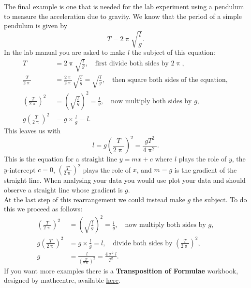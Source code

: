 The final example is one that is needed for the lab experiment using a pendulum to measure the acceleration due to gravity. We know that the period of a simple pendulum is given by
\begin{equation*}
T=2\uppi\sqrt{\frac{l}{g}}.
\end{equation*}
In the lab manual you are asked to make $l$ the subject of this equation:
\begin{align*}
T&=2\uppi\sqrt{\frac{l}{g}}, \quad \text{first divide both sides by $2\uppi$},\\
\frac{T}{2\uppi}&=\frac{2\uppi}{2\uppi}\sqrt{\frac{l}{g}}=\sqrt{\frac{l}{g}}, \quad \text{then square both sides of the equation},\\
\left(\frac{T}{2\uppi}\right)^{2}&=\left(\sqrt{\frac{l}{g}}\right)^{2}=\frac{l}{g}, \quad \text{now multiply both sides by $g$},\\
g\left(\frac{T}{2\uppi}\right)^{2}&=g\times\frac{l}{g}=l.
\end{align*}
This leaves us with
\begin{equation*}
l=g\left(\frac{T}{2\uppi}\right)^{2}=\frac{gT^{2}}{4\uppi^{2}}.
\end{equation*}
This is the equation for a straight line $y=mx+c$ where $l$ plays the role of $y$, the $y$-intercept $c=0$, $\left(\frac{T}{2\uppi}\right)^{2}$ plays the role of $x$, and $m=g$ is the gradient of the straight line. When analysing your data you would use plot your data and should observe a straight line whose gradient is $g$.\\

At the last step of this rearrangement we could instead make $g$ the subject. To do this we proceed as follows:
\begin{align*}
\left(\frac{T}{2\uppi}\right)^{2}&=\left(\sqrt{\frac{l}{g}}\right)^{2}=\frac{l}{g}, \quad \text{now multiply both sides by $g$},\\
g\left(\frac{T}{2\uppi}\right)^{2}&=g\times \frac{l}{g}=l, \quad \text{divide both sides by }\left(\frac{T}{2\uppi}\right)^{2}, \\
g&=\frac{l}{\left(\frac{T}{2\uppi}\right)^{2}}=\frac{4\uppi^{2} l}{T^{2}}.
\end{align*}
If you want more examples there is a \textbf{Transposition of Formulae} workbook, designed by mathcentre,  available \href{https://www.mathcentre.ac.uk/resources/uploaded/mc-ty-transposition-2009-1.pdf}{here}.

